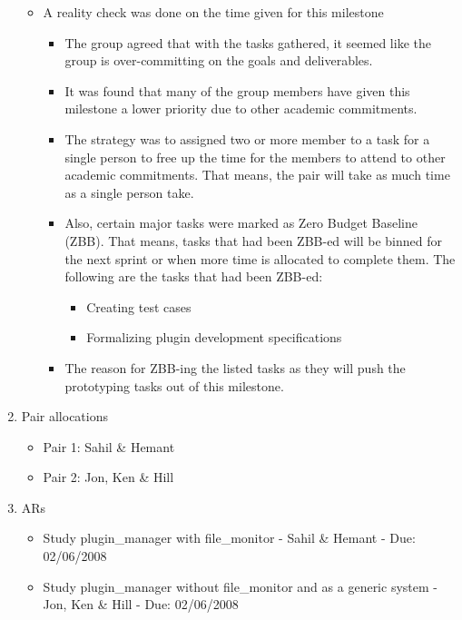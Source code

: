 \documentclass{letter}
\begin{document}
\begin{enumerate}
\begin{itemize}
\begin{itemize}
\begin{itemize}
					\end{itemize}
			  \end{itemize}
		\item A reality check was done on the time given for this milestone
			\begin{itemize}
				\item The group agreed that with the tasks gathered, it seemed like the group is over-committing on the goals and deliverables. 
				\item It was found that many of the group members have given this milestone a lower priority due to other academic commitments.
				\item The strategy was to assigned two or more member to a task for a single person to free up the time for the members to attend to other academic commitments. That means, the pair will take as much time as a single person take. 
				\item Also, certain major tasks were marked as Zero Budget Baseline (ZBB). That means, tasks that had been ZBB-ed will be binned for the next sprint or when more time is allocated to complete them. The following are the tasks that had been ZBB-ed: 
					\begin{itemize}
					\item Creating test cases
					\item Formalizing plugin development specifications 
					\end{itemize}
				\item The reason for ZBB-ing the listed tasks as they will push the prototyping tasks out of this milestone. 
			\end{itemize}
	\end{itemize}
\item Pair allocations
	\begin{itemize}
		\item Pair 1: Sahil \& Hemant
		\item Pair 2: Jon, Ken \& Hill
	\end{itemize}
\item ARs
	\begin{itemize}
		\item Study plugin\_manager with file\_monitor - Sahil \& Hemant - Due: 02/06/2008
		\item Study plugin\_manager without file\_monitor and as a generic system - Jon, Ken \& Hill - Due: 02/06/2008
	\end{itemize}
\end{enumerate} 
\end{document}
